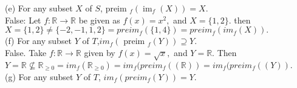 \documentclass[12pt, letterpaper]{article}
\newcommand{\R}{\mathbb{R}}
\begin{document}
(e) For any subset $X$ of $S$, preim $_f\left(\operatorname{im}_f(X)\right)=X$.\\
False: Let $f: \R \to \R$ be given as $f(x) = x^2,$ and $X = 
\{1,2\}$.  
then $X = \{1,2\} \neq \{-2,-1,1,2\} = 
preim_f(\{1,4\}) = preim_f(im_f(X)).$  \\
(f) For any subset $Y$ of $T$,$im_f\left(\right.$ preim $\left._f(Y)\right) \supseteq Y$.\\
	False. Take $f: \R \to \R$ given by $f(x) = \sqrt{x},$ and $Y= \R.$  Then $Y = \R \not \subseteq \R_{\geq 0} = im_f(\R_{\geq 0}) = im_f(preim_f((\R)) = im_f(preim_f((Y)).$ \\
(g) For any subset $Y$ of $T$, $im_f (preim_f(Y))=Y$.\\
\end{document}
